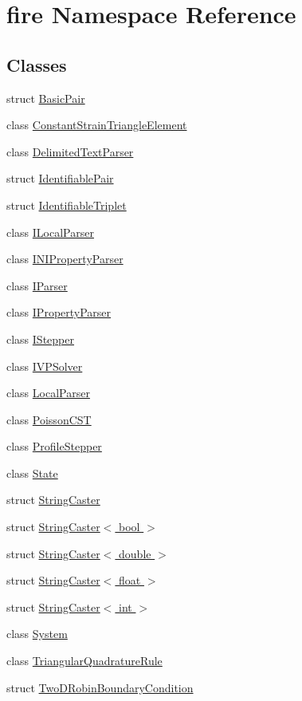 \hypertarget{a00189}{}\section{fire Namespace Reference}
\label{a00189}
\subsection*{Classes}
\begin{DoxyCompactItemize}
\item 
struct \hyperlink{a00768}{Basic\+Pair}
\item 
class \hyperlink{a00764}{Constant\+Strain\+Triangle\+Element}
\item 
class \hyperlink{a00800}{Delimited\+Text\+Parser}
\item 
struct \hyperlink{a00772}{Identifiable\+Pair}
\item 
struct \hyperlink{a00776}{Identifiable\+Triplet}
\item 
class \hyperlink{a00804}{I\+Local\+Parser}
\item 
class \hyperlink{a00808}{I\+N\+I\+Property\+Parser}
\item 
class \hyperlink{a00812}{I\+Parser}
\item 
class \hyperlink{a00816}{I\+Property\+Parser}
\item 
class \hyperlink{a00788}{I\+Stepper}
\item 
class \hyperlink{a00860}{I\+V\+P\+Solver}
\item 
class \hyperlink{a00820}{Local\+Parser}
\item 
class \hyperlink{a00784}{Poisson\+C\+ST}
\item 
class \hyperlink{a00792}{Profile\+Stepper}
\item 
class \hyperlink{a00864}{State}
\item 
struct \hyperlink{a00824}{String\+Caster}
\item 
struct \hyperlink{a00840}{String\+Caster$<$ bool $>$}
\item 
struct \hyperlink{a00828}{String\+Caster$<$ double $>$}
\item 
struct \hyperlink{a00832}{String\+Caster$<$ float $>$}
\item 
struct \hyperlink{a00836}{String\+Caster$<$ int $>$}
\item 
class \hyperlink{a00796}{System}
\item 
class \hyperlink{a00856}{Triangular\+Quadrature\+Rule}
\item 
struct \hyperlink{a00780}{Two\+D\+Robin\+Boundary\+Condition}
\end{DoxyCompactItemize}
